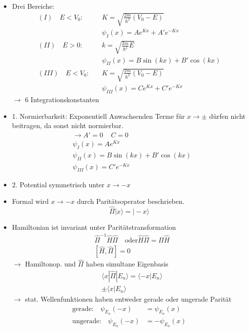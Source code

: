 \documentclass[10pt,article,colorback,accentcolor=tud9d]{scrartcl}
\begin{document}
    \begin{itemize}
      \item Drei Bereiche:
        \begin{align}
          (I) \quad E<V_0: \quad &K=\sqrt{\frac{2m}{\hbar^2}(V_0-E)}\\
          &\psi_I(x)=Ae^{Kx}+A'e^{-Kx}\\
          (II) \quad E>0: \quad &k=\sqrt{\frac{2m}{\hbar^2}E}\\
          &\psi_{II}(x)=B\sin(kx)+B'\cos(kx)\\
          (III) \quad E<V_0: \quad &K=\sqrt{\frac{2m}{\hbar^2}(V_0-E)}\\
          &\psi_{III}(x)=Ce^{Kx}+C'e^{-Kx}
        \end{align}
        $\rightarrow$ 6 Integrationskonstanten
      \item 1. Normierbarkeit: Exponentiell Anwachsenden Terme für $x\rightarrow \pm$ dürfen nicht beitragen, da sonst nicht normierbar.
        \begin{align}
          &\rightarrow A'=0 \, \quad C=0\\
          &\psi_I(x)=Ae^{Kx}\\
          &\psi_{II}(x)=B\sin(kx)+B'\cos(kx)\\
          &\psi_{III}(x)=C'e^{-Kx}
        \end{align}
      \item 2. Potential symmetrisch unter $x\rightarrow-x$
      \item Formal wird $x\rightarrow-x$ durch Paritätsoperator beschrieben.
        \begin{equation}
        \hat{\Pi}|x\rangle=|-x\rangle
        \end{equation}
      \item Hamiltonian ist invariant unter Paritätstransformation
        \begin{align}
          &\hat{\Pi}^{-1}\hat{H}\hat{\Pi} \quad \text{oder} \hat{H}\hat{\Pi}=\hat{\Pi}\hat{H}\\
          &[\hat{H},\hat{\Pi}]=0
        \end{align}
        $\rightarrow$ Hamiltonop. und $\hat{\Pi}$ haben simultane Eigenbasis
        \begin{align}
        &\langle x|\hat{\Pi}|E_n\rangle=\langle-x|E_n\rangle\\
        &\pm\langle x|E_n\rangle
        \end{align}
        $\rightarrow$ stat. Wellenfunktionen haben entweder gerade oder ungerade Parität
        \begin{align}
        \text{gerade:}\quad \psi_{E_n}(-x)&=\psi_{E_n}(x)\\
        \text{ungerade:}\quad \psi_{E_n}(-x)&=-\psi_{E_n}(x)
        \end{align}
    \end{itemize}
 
\end{document}
